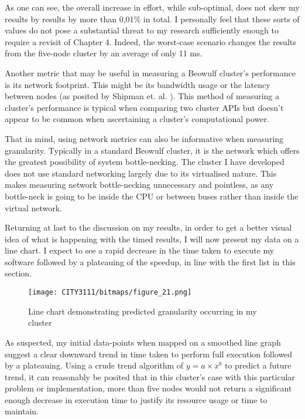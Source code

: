 As one can see, the overall increase in effort, while sub-optimal, does not skew my results by results by more than 0,01\% in total. I personally feel that these sorts of values do not pose a substantial threat to my research sufficiently enough to require a revisit of Chapter 4. Indeed, the worst-case scenario changes the results from the five-node cluster by an average of only 11 ms.

\textbf{}

Another metric that may be useful in measuring a Beowulf cluster's performance is its network footprint. This might be its bandwidth usage or the latency between nodes (as posited by Shipman et. al. \cite{shipman_et_al_2006}). This method of measuring a cluster's performance is typical when comparing two cluster APIs but doesn't appear to be common when ascertaining a cluster's computational power.

That in mind, using network metrics can also be informative when measuring granularity. Typically in a standard Beowulf cluster, it is the network which offers the greatest possibility of system bottle-necking. The cluster I have developed does not use standard networking largely due to its virtualised nature. This makes measuring network bottle-necking unnecessary and pointless, as any bottle-neck is going to be inside the CPU or between buses rather than inside the virtual network.

\textbf{}

Returning at last to the discussion on my results, in order to get a better visual idea of what is happening with the timed results, I will now present my data on a line chart. I expect to see a rapid decrease in the time taken to execute my software followed by a plateauing of the speedup, in line with the first list in this section.

\begin{figure}[H]
    \texttt{[image: CITY3111/bitmaps/figure\_21.png]}
    \caption{Line chart demonstrating predicted granularity occurring in my cluster}
    \label{figure_21}
\end{figure}

As suspected, my initial data-points when mapped on a smoothed line graph suggest a clear downward trend in time taken to perform full execution followed by a plateauing. Using a crude trend algorithm of $y = a \times x^{b}$ to predict a future trend, it can reasonably be posited that in this cluster's case with this particular problem or implementation, more than five nodes would not return a significant enough decrease in execution time to justify its resource usage or time to maintain.

